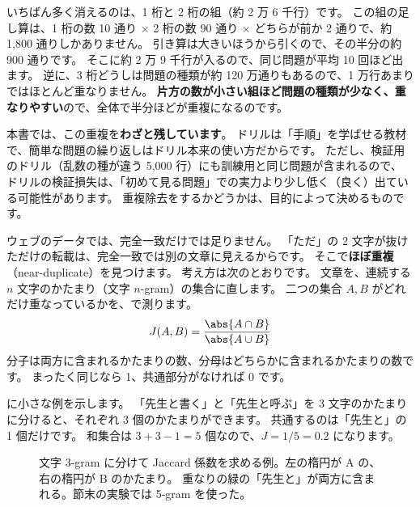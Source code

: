 いちばん多く消えるのは、1 桁と 2 桁の組（約 2 万 6 千行）です。
この組の足し算は、1 桁の数 10 通り × 2 桁の数 90 通り × どちらが前か 2 通りで、約 1,800 通りしかありません。
引き算は大きいほうから引くので、その半分の約 900 通りです。
そこに約 2 万 9 千行が入るので、同じ問題が平均 10 回ほど出ます。
逆に、3 桁どうしは問題の種類が約 120 万通りもあるので、1 万行あまりではほとんど重なりません。
\textbf{片方の数が小さい組ほど問題の種類が少なく、重なりやすい}ので、全体で半分ほどが重複になるのです。

本書では、この重複を\textbf{わざと残しています}。
ドリルは「手順」を学ばせる教材で、簡単な問題の繰り返しはドリル本来の使い方だからです。
ただし、検証用のドリル（乱数の種が違う 5,000 行）にも訓練用と同じ問題が含まれるので、
ドリルの検証損失は、「初めて見る問題」での実力より少し低く（良く）出ている可能性があります。
重複除去をするかどうかは、目的によって決めるものです。

ウェブのデータでは、完全一致だけでは足りません。
「ただ」の 2 文字が抜けただけの転載は、完全一致では別の文章に見えるからです。
そこで\textbf{ほぼ重複}（near-duplicate）を見つけます。
考え方は次のとおりです。
文章を、連続する $n$ 文字のかたまり（文字 $n$-gram）の集合に直します。
二つの集合 $A, B$ がどれだけ重なっているかを、で測ります。
\begin{equation}
J(A, B) = \frac{\abs{A\cap B}}{\abs{A\cup B}}
\label{eq:pt-jaccard}
\end{equation}
分子は両方に含まれるかたまりの数、分母はどちらかに含まれるかたまりの数です。
まったく同じなら 1、共通部分がなければ 0 です。

に小さな例を示します。
「先生と書く」と「先生と呼ぶ」を 3 文字のかたまりに分けると、それぞれ 3 個のかたまりができます。
共通するのは「先生と」の 1 個だけです。
和集合は $3 + 3 - 1 = 5$ 個なので、$J = 1/5 = 0.2$ になります。

\begin{figure}[tbp]
\centering
{}
\caption{文字 3-gram に分けて Jaccard 係数を求める例。左の楕円が A の、右の楕円が B のかたまり。
重なりの緑の「先生と」が両方に含まれる。節末の実験では 5-gram を使った。}
\label{fig:pt-shingle}
\end{figure}

